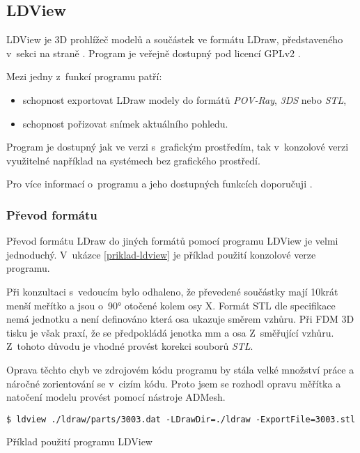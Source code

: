 \subsection{LDView}
LDView je 3D prohlížeč modelů a součástek ve formátu LDraw, představeného v~sekci  na straně \pageref{ldraw-format}. Program je veřejně dostupný pod licencí \gls{GPLv2} \autocite{GPLv2}.

Mezi jedny z~funkcí programu patří: 
\begin{itemize}
    \item schopnost exportovat LDraw modely do formátů \textit{POV-Ray}, \textit{3DS} nebo \textit{STL},
    \item schopnost pořizovat snímek aktuálního pohledu.
\end{itemize}

Program je dostupný jak ve verzi s~grafickým prostředím, tak v~konzolové verzi využitelné například na systémech bez grafického prostředí.

Pro více informací o~programu a jeho dostupných funkcích doporučuji \autocite{ldview}.

\subsubsection*{Převod formátu}

Převod formátu LDraw do jiných formátů pomocí programu LDView je velmi jednoduchý. V~ukázce \ref{priklad-ldview} je příklad použití konzolové verze programu. 

Při konzultaci s~vedoucím bylo odhaleno, že převedené součástky mají 10krát menší meřítko a jsou o~90° otočené kolem osy X. Formát \gls{STL} dle specifikace \autocite{stl:specification} nemá jednotku a není definováno která osa ukazuje směrem vzhůru. Při \gls{FDM} 3D tisku je však praxí, že se předpokládá jenotka mm a osa Z~směřující vzhůru. Z~tohoto důvodu je vhodné provést korekci souborů \textit{STL}.

Oprava těchto chyb ve zdrojovém kódu programu by stála velké množství práce a náročné zorientování se v~cizím kódu. Proto jsem se rozhodl opravu měřítka a natočení modelu provést pomocí nástroje ADMesh. 

 \begin{listing}[htbp]
        \begin{verbatim}
$ ldview ./ldraw/parts/3003.dat -LDrawDir=./ldraw -ExportFile=3003.stl 
        \end{verbatim}
    \caption{Příklad použití programu LDView \label{priklad-ldview}}
\end{listing}


